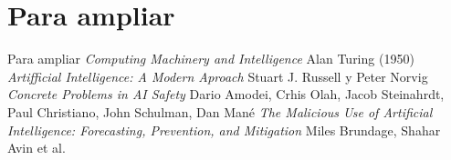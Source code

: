 \documentclass[xcolor=table]{beamer}
\begin{document}
\section{Para ampliar}
\begin{frame}{Para ampliar}
\textit{Computing Machinery and Intelligence} Alan Turing (1950)
\newline
\newline
\textit{Artifficial Intelligence: A Modern Aproach} Stuart J. Russell y Peter Norvig
\newline
\newline
\textit{Concrete Problems in AI Safety} Dario Amodei, Crhis Olah, Jacob Steinahrdt, Paul Christiano, John Schulman, Dan Mané
\newline
\newline
\textit{The Malicious Use of Artificial Intelligence: Forecasting, Prevention, and Mitigation} Miles Brundage, Shahar Avin et al.
\end{frame}
\end{document}
